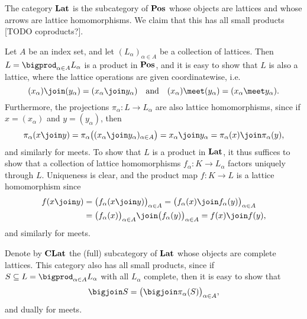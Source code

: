 \documentclass[article, a4paper, 11pt, oneside]{memoir}
\numberwithin{equation}{chapter}
\theoremstyle{nonumberplain}
\begin{document}
\begin{remarkbreak}
    The category $\mathbf{Lat}$ is the subcategory of $\mathbf{Pos}$ whose objects are lattices and whose arrows are lattice homomorphisms. We claim that this has all small products [TODO coproducts?].

    Let $A$ be an index set, and let $(L_\alpha)_{\alpha \in A}$ be a collection of lattices. Then $L = \bigprod_{\alpha \in A} L_\alpha$ is a product in $\mathbf{Pos}$, and it is easy to show that $L$ is also a lattice, where the lattice operations are given coordinatewise, i.e.
    \begin{equation*}
        (x_\alpha) \join (y_\alpha)
            = (x_\alpha \join y_\alpha)
        \quad \text{and} \quad
        (x_\alpha) \meet (y_\alpha)
            = (x_\alpha \meet y_\alpha).
    \end{equation*}
    Furthermore, the projections $\pi_\alpha \colon L \to L_\alpha$ are also lattice homomorphisms, since if $x = (x_\alpha)$ and $y = (y_\alpha)$, then
    \begin{equation*}
        \pi_\alpha(x \join y)
            = \pi_\alpha \bigl( (x_\alpha \join y_\alpha)_{\alpha \in A} \bigr)
            = x_\alpha \join y_\alpha
            = \pi_\alpha(x) \join \pi_\alpha(y),
    \end{equation*}
    and similarly for meets. To show that $L$ is a product in $\mathbf{Lat}$, it thus suffices to show that a collection of lattice homomorphisms $f_\alpha \colon K \to L_\alpha$ factors uniquely through $L$. Uniqueness is clear, and the product map $f \colon K \to L$ is a lattice homomorphism since
    \begin{align*}
        f(x \join y)
            &= \bigl( f_\alpha(x \join y) \bigr)_{\alpha \in A}
             = \bigl( f_\alpha(x) \join f_\alpha(y) \bigr)_{\alpha \in A} \\
            &= \bigl( f_\alpha(x) \bigr)_{\alpha \in A} \join \bigl( f_\alpha(y) \bigr)_{\alpha \in A}
             = f(x) \join f(y),
    \end{align*}
    and similarly for meets.

    Denote by $\mathbf{CLat}$ the (full) subcategory of $\mathbf{Lat}$ whose objects are complete lattices. This category also has all small products, since if $S \subseteq L = \bigprod_{\alpha \in A} L_\alpha$ with all $L_\alpha$ complete, then it is easy to show that
    \begin{equation*}
        \bigjoin S
            = \bigl( \bigjoin \pi_\alpha(S) \bigr)_{\alpha \in A},
    \end{equation*}
    and dually for meets.
\end{remarkbreak}
\end{document}
